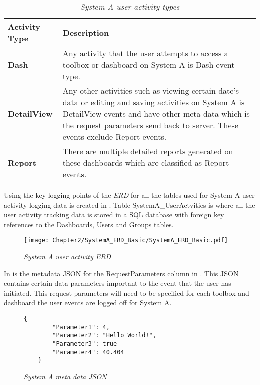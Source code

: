 \begin{table}[!htb]
	\centering
	\small
	\caption[System A user activity types]
	{\textit{System A user activity types}}
	\label{tbl:Ch2_SystemA_EventTypes}
	\begin{tabularx}{\textwidth}{|l|X|}
		\hline \textbf{Activity Type} & \textbf{Description} \\
		\hline \textbf{Dash} & Any activity that the user attempts to access a toolbox or dashboard on System A is Dash event type. \\
		\hline \textbf{DetailView} & Any other activities such as viewing certain date's data or editing and saving activities on System A is DetailView events and have other meta data which is the request parameters send back to server. These events exclude Report events. \\
		\hline \textbf{Report} & There are multiple detailed reports generated on these dashboards which are classified as Report events. \\
		\hline
	\end{tabularx}
\end{table}

Using the key logging points of  the \emph{ERD} for all the tables used for System A user activity logging data is created in . Table SystemA\_UserActvities is where all the user activity tracking data is stored in a SQL database with foreign key references to the Dashboards, Users and Groups tables.

\begin{figure}[!htb] %
	\centering %
	\texttt{[image: Chapter2/SystemA\_ERD\_Basic/SystemA\_ERD\_Basic.pdf]}
	\caption[System A user activity ERD]
	{\textit{System A user activity ERD}}\label{fig:Ch2_SystemA_Basic_ERD}
\end{figure}

\clearpage

In  is the metadata JSON for the RequestParameters column in . This JSON contains certain data parameters important to the event that the user has initiated. This request parameters will need to be specified for each toolbox and dashboard the user events are logged off for System A.

\begin{figure}[!htb]
	\centering
	\begin{lstlisting}[style=json] 
	{
		"Parameter1": 4,
		"Parameter2": "Hello World!",
		"Parameter3": true
		"Parameter4": 40.404
	}
	\end{lstlisting}
	\caption[System A meta data JSON]
	{\textit{System A meta data JSON}}\label{fig:CH2_SystemAMetaData}
\end{figure}

